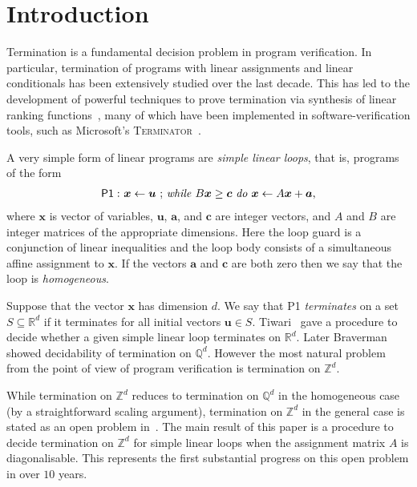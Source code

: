 \chapter{Introduction}
\label{sec:introduction}
Termination is a fundamental decision problem in program verification.
In particular, termination of programs with linear assignments and
linear conditionals has been extensively studied over the last decade.
This has led to the development of powerful techniques to
prove termination via synthesis of linear ranking
functions~\cite{Ben-AmramG13,BradleyMS05,ChenFM12,ColonS01,PodelskiR04},
many of which have been implemented in software-verification tools, such as
Microsoft's \textsc{Terminator}~\cite{CookPR06}.

A very simple form of linear programs are \emph{simple linear
  loops}, that is, programs of the form
\begin{gather*}
\mathsf{P1:}\  \mbox{$\boldsymbol{x}\gets \boldsymbol{u}$ ;
\textit{while} $B\boldsymbol{x} \geq \boldsymbol{c}$ \textit{do}
$\boldsymbol{x}\leftarrow A\boldsymbol{x}+\boldsymbol{a}$,}
\end{gather*}
where $\boldsymbol{x}$ is vector of variables, $\boldsymbol{u}$,
$\boldsymbol{a}$, and $\boldsymbol{c}$ are integer vectors, and $A$
and $B$ are integer matrices of the appropriate dimensions.  Here the
loop guard is a conjunction of linear inequalities and the loop body
consists of a simultaneous affine assignment to $\boldsymbol{x}$.  If
the vectors $\boldsymbol{a}$ and $\boldsymbol{c}$ are both zero then
we say that the loop is \emph{homogeneous}.

Suppose that the vector $\boldsymbol{x}$ has dimension $d$.  We say
that \textsf{P1} \emph{terminates} on a set $S\subseteq \mathbb{R}^d$
if it terminates for all initial vectors $\boldsymbol{u} \in S$.
Tiwari~\cite{Tiw04} gave a procedure to decide whether a given simple
linear loop terminates on $\mathbb{R}^d$.  Later
Braverman~\cite{Bra06} showed decidability of termination on
$\mathbb{Q}^d$.  However the most natural problem from the point of
view of program verification is termination on $\mathbb{Z}^d$.

While termination on $\mathbb{Z}^d$ reduces to termination on
$\mathbb{Q}^d$ in the homogeneous case (by a straightforward scaling
argument), termination on $\mathbb{Z}^d$ in the general case is stated
as an open problem in~\cite{BGM12,Bra06,Tiw04}.  The main result of
this paper is a procedure to decide termination on $\mathbb{Z}^d$ for
simple linear loops when the assignment matrix $A$ is diagonalisable.
This represents the first substantial progress on this open problem in
over $10$ years.

